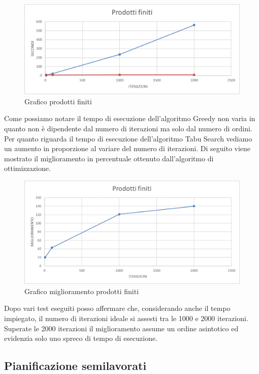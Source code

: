 \begin{figure}[H]
	\includegraphics[width=13cm]{immagini/graficoPF2.png}
	\centering
	\caption{Grafico prodotti finiti}
\end{figure}

Come possiamo notare il tempo di esecuzione dell'algoritmo Greedy non varia in quanto non è dipendente dal numero di iterazioni ma solo dal numero di ordini.\\
Per quanto riguarda il tempo di esecuzione dell'algoritmo Tabu Search vediamo un aumento in proporzione al variare del numero di iterazioni.
Di seguito viene mostrato il miglioramento in percentuale ottenuto dall'algoritmo di ottimizzazione.

\begin{figure}[H]
	\includegraphics[width=13cm]{immagini/graficoPF3.png}
	\centering
	\caption{Grafico miglioramento prodotti finiti}
\end{figure}

Dopo vari test eseguiti posso affermare che, considerando anche il tempo impiegato, il numero di iterazioni ideale si assesti tra le 1000 e 2000 iterazioni.
Superate le 2000 iterazioni il miglioramento assume un ordine asintotico ed evidenzia solo uno spreco di tempo di esecuzione. 

\newpage
\subsection{Pianificazione semilavorati}


